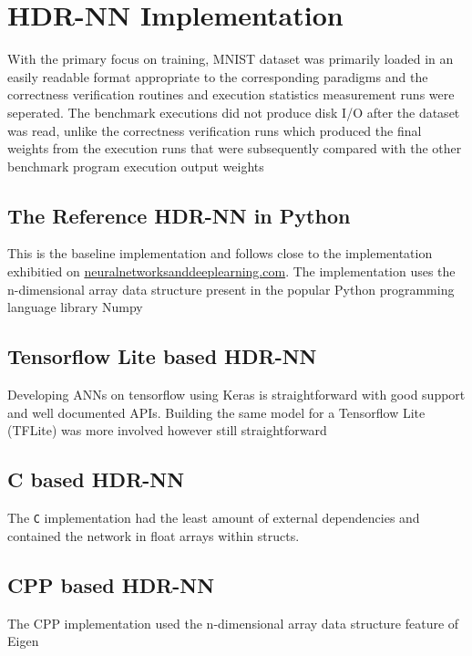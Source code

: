 \section{HDR-NN Implementation}

With the primary focus on training, MNIST dataset was primarily loaded in an easily readable format appropriate to the corresponding paradigms and the correctness verification routines and execution statistics measurement runs were seperated. The benchmark executions did not produce disk I/O after the dataset was read, unlike the correctness verification runs which produced the final weights from the execution runs that were subsequently compared with the other benchmark program execution output weights

\subsection[Python - Numpy]{The Reference HDR-NN in Python}

This is the baseline implementation and follows close to the implementation exhibitied on \href{http://neuralnetworksanddeeplearning.com}{neuralnetworksanddeeplearning.com}. The implementation uses the n-dimensional array data structure present in the popular Python programming language library Numpy

\subsection[Tensorflow Lite]{Tensorflow Lite based HDR-NN}

Developing ANNs on tensorflow using Keras is straightforward with good support and well documented APIs. Building the same model for a Tensorflow Lite (TFLite) was more involved however still straightforward

\subsection[C]{C based HDR-NN}

The \verb!C! implementation had the least amount of external dependencies and contained the network in float arrays within structs.

\subsection[CPP - Eigen]{CPP based HDR-NN}

The CPP implementation used the n-dimensional array data structure feature of Eigen
